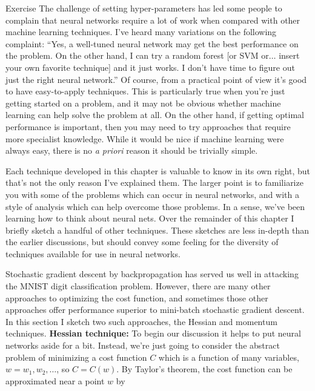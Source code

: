 \begin{exerciseBox}{Exercise}
The challenge of setting hyper-parameters has led some people to complain that neural networks require a lot of work when compared with other machine learning techniques. I've heard many variations on the following complaint: ``Yes, a well-tuned neural network may get the best performance on the problem. On the other hand, I can try a random forest [or SVM or$\ldots$ insert your own favorite technique] and it just works. I don't have time to figure out just the right neural network.'' Of course, from a practical point of view it's good to have easy-to-apply techniques. This is particularly true when you're just getting started on a problem, and it may not be obvious whether machine learning can help solve the problem at all. On the other hand, if getting optimal performance is important, then you may need to try approaches that require more specialist knowledge. While it would be nice if machine learning were always easy, there is no \emph{a priori} reason it should be trivially simple.

\end{exerciseBox}





Each technique developed in this chapter is valuable to know in its own right, but that's not the only reason I've explained them. The larger point is to familiarize you with some of the problems which can occur in neural networks, and with a style of analysis which can help overcome those problems. In a sense, we've been learning how to think about neural nets. Over the remainder of this chapter I briefly sketch a handful of other techniques. These sketches are less in-depth than the earlier discussions, but should convey some feeling for the diversity of techniques available for use in neural networks.





Stochastic gradient descent by backpropagation has served us well in attacking the MNIST digit classification problem. However, there are many other approaches to optimizing the cost function, and sometimes those other approaches offer performance superior to mini-batch stochastic gradient descent. In this section I sketch two such approaches, the Hessian and momentum techniques. \textbf{Hessian technique:} To begin our discussion it helps to put neural networks aside for a bit. Instead, we're just going to consider the abstract problem of minimizing a cost function $C$ which is a function of many variables, $w = w_1, w_2, \ldots$, so $C = C(w)$. By Taylor's theorem, the cost function can be approximated near a point $w$ by

